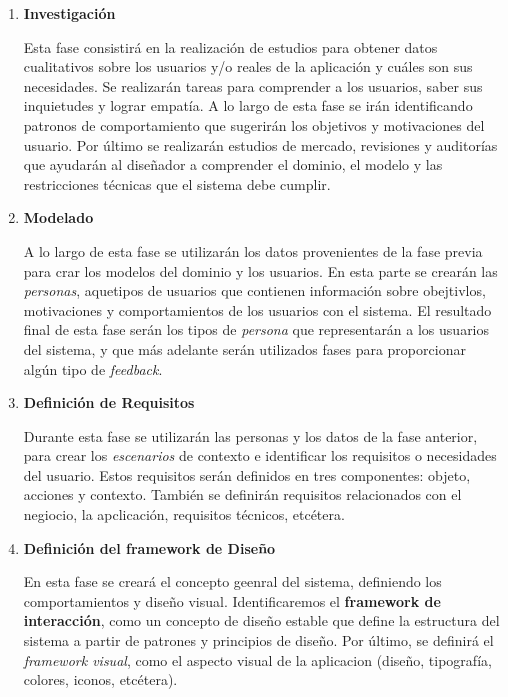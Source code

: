 \begin{enumerate}

\item \textbf{Investigación}

Esta fase consistirá en la realización de estudios para obtener datos cualitativos sobre los usuarios y/o reales de la aplicación y cuáles son sus necesidades. Se realizarán tareas para comprender a los usuarios, saber sus inquietudes y lograr empatía. A lo largo de esta fase se irán identificando patronos de comportamiento que sugerirán los objetivos y motivaciones del usuario. Por último se realizarán estudios de mercado, revisiones y auditorías que ayudarán al diseñador a comprender el dominio, el modelo y las restricciones técnicas que el sistema debe cumplir.

\item \textbf{Modelado}

A lo largo de esta fase se utilizarán los datos provenientes de la fase previa para crar los modelos del dominio y los usuarios. En esta parte se crearán las \textit{personas}, aquetipos de usuarios que contienen información sobre obejtivlos, motivaciones y comportamientos de los usuarios con el sistema. El resultado final de esta fase serán los tipos de \textit{persona} que representarán a los usuarios del sistema, y que más adelante serán utilizados fases para proporcionar algún tipo de \textit{feedback}.

\item \textbf{Definición de Requisitos}

Durante esta fase se utilizarán las personas y los datos de la fase anterior, para crear los \textit{escenarios} de contexto e identificar los requisitos o necesidades del usuario. Estos requisitos serán definidos en tres componentes: objeto, acciones y contexto. También se definirán requisitos relacionados con el negiocio, la apclicación, requisitos técnicos, etcétera.

\item \textbf{Definición del framework de Diseño}

En esta fase se creará el concepto geenral del sistema, definiendo los comportamientos y diseño visual. Identificaremos el \textbf{framework de interacción}, como un concepto de diseño estable que define la estructura del sistema a partir de patrones y principios de diseño. Por último, se definirá el \textit{framework visual}, como el aspecto visual de la aplicacion (diseño, tipografía, colores, iconos, etcétera).

\end{enumerate}

